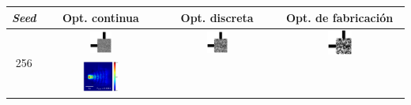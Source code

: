 \begin{table}[ht]
    \centering
    \vspace*{-2.5cm}
    \hspace*{-3cm}
    \begin{tabular}{|c|c|c|c|}
    \hline 
    \emph{Seed} & Opt. continua & Opt. discreta &  Opt. de fabricación \\
    \hline
      \multirow{2}{*}{256} &
      \includegraphics[width=0.20\textwidth]{image/results/bend/MMA/visualize_eps_cont_256.png} &
      \includegraphics[width=0.20\textwidth]{image/results/bend/MMA/visualize_eps_disc_256.png} &
      \includegraphics[width=0.20\textwidth]{image/results/bend/MMA/visualize_eps_fab_256.png} \\
      \cline{2-4}
      &
      \includegraphics[width=0.33\textwidth]{image/results/bend/MMA/visualize_field_cont_256.png} &

\end{tabular}
\end{table}
